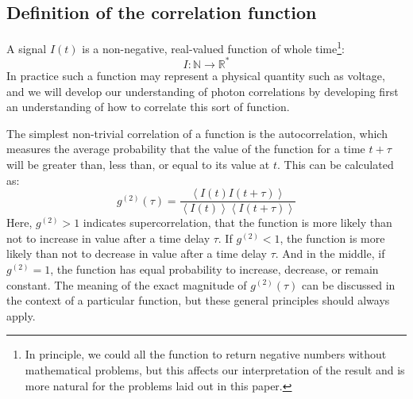 \documentclass{article}
\newcommand{\angles}[1]{\ensuremath{\left\langle #1 \right\rangle}}
\newcommand{\gn}[1]{\ensuremath{g^{(#1)}}}
\newcommand{\wholes}{\ensuremath{\mathbb{N}}}
\newcommand{\reals}{\ensuremath{\mathbb{R}}}
\begin{document}
\subsection{Definition of the correlation function}
\label{sec:correlation_function}
A signal $I(t)$ is a non-negative, real-valued function of whole time\footnote{In principle, we could all the function to return negative numbers without mathematical problems, but this affects our interpretation of the result and is more natural for the problems laid out in this paper.}:
\begin{equation}
I:\wholes\rightarrow\reals^{*}
\end{equation}
In practice such a function may represent a physical quantity such as voltage, and we will develop our understanding of photon correlations by developing first an understanding of how to correlate this sort of function. 

The simplest non-trivial correlation of a function is the autocorrelation, which measures the average probability that the value of the function for a time $t+\tau$ will be greater than, less than, or equal to its value at $t$. This can be calculated as:
\begin{equation}
\label{eq:autocorrelation}
\gn{2}(\tau) = \frac{\angles{I(t)I(t+\tau)}}
                    {\angles{I(t)}\angles{I(t+\tau)}}
\end{equation}
Here, $\gn{2}>1$ indicates supercorrelation, that the function is more likely than not to increase in value after a time delay $\tau$. If $\gn{2}<1$, the function is more likely than not to decrease in value after a time delay $\tau$. And in the middle, if $\gn{2}=1$, the function has equal probability to increase, decrease, or remain constant. The meaning of the exact magnitude of $\gn{2}(\tau)$ can be discussed in the context of a particular function, but these general principles should always apply.
\end{document}
